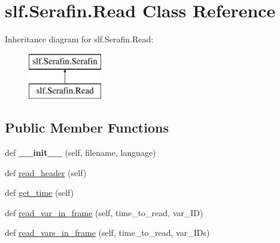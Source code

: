 \hypertarget{classslf_1_1_serafin_1_1_read}{}\section{slf.\+Serafin.\+Read Class Reference}
\label{classslf_1_1_serafin_1_1_read}
Inheritance diagram for slf.\+Serafin.\+Read\+:\begin{figure}[H]
\begin{center}
\leavevmode
\includegraphics[height=2.000000cm]{classslf_1_1_serafin_1_1_read}
\end{center}
\end{figure}
\subsection*{Public Member Functions}
\begin{DoxyCompactItemize}
\item 
def {\bfseries \+\_\+\+\_\+init\+\_\+\+\_\+} (self, filename, language)\hypertarget{classslf_1_1_serafin_1_1_read_aa7eaebfcdae3b00fc707c2279d0c4a9d}{}\label{classslf_1_1_serafin_1_1_read_aa7eaebfcdae3b00fc707c2279d0c4a9d}

\item 
def \hyperlink{classslf_1_1_serafin_1_1_read_af39c4170b7ef9b3a905f1b3d346fd29d}{read\+\_\+header} (self)
\item 
def \hyperlink{classslf_1_1_serafin_1_1_read_a546fa1a855a32c2fb0f54fed90045f7e}{get\+\_\+time} (self)
\item 
def \hyperlink{classslf_1_1_serafin_1_1_read_ac39cd63066cf76a0eada17d7ac9b2dca}{read\+\_\+var\+\_\+in\+\_\+frame} (self, time\+\_\+to\+\_\+read, var\+\_\+\+ID)
\item 
def \hyperlink{classslf_1_1_serafin_1_1_read_a07998898fcbf25965cd16a907a583d18}{read\+\_\+vars\+\_\+in\+\_\+frame} (self, time\+\_\+to\+\_\+read, var\+\_\+\+I\+Ds)
\end{DoxyCompactItemize}
